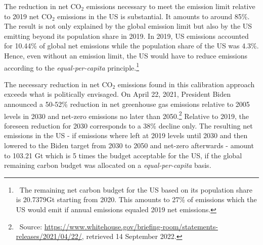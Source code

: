  The reduction in net CO$_2$ emissions necessary to meet the emission limit relative to 2019 net CO$_2$ emissions in the US  is substantial. It amounts to around 85\%. The result is not only explained by the global emission limit but also by the US emitting beyond its population share in 2019. In 2019, US emissions accounted for 10.44\% of global net emissions while the population share of the US was 4.3\%. Hence, even without an emission limit, the US would have to reduce emissions according to the \textit{equal-per-capita} principle.\footnote{\ The remaining net carbon budget for the US based on its population share is 20.7379Gt starting from 2020. This amounts to 27\% of emissions which the US would emit if annual emissions equaled 2019 net emissions.} 
 
 The necessary reduction in net CO$_2$ emissions found in this calibration approach exceeds what is politically envisaged. On April 22, 2021, President Biden announced a 50-52\% reduction in net greenhouse gas emissions relative to 2005 levels in 2030 %
 and net-zero emissions no later than 2050.\footnote{\ Source: \href{https://www.whitehouse.gov/briefing-room/statements-releases/2021/04/22/fact-sheet-president-biden-sets-2030-greenhouse-gas-pollution-reduction-target-aimed-at-creating-good-paying-union-jobs-and-securing-u-s-leadership-on-clean-energy-technologies/}{https://www.whitehouse.gov/briefing-room/statements-releases/2021/04/22/}, retrieved 14 September 2022.} 
 Relative to 2019, the foreseen reduction for 2030 corresponds to a 38\% decline only.
  The resulting net emissions in the US - if emissions where left at 2019 levels until 2030 and then lowered to the Biden target from 2030 to 2050 and net-zero afterwards - amount to 103.21 Gt which is 5 times the budget acceptable for the US,  if the global remaining carbon budget was allocated on a \textit{equal-per-capita} basis. 

 




